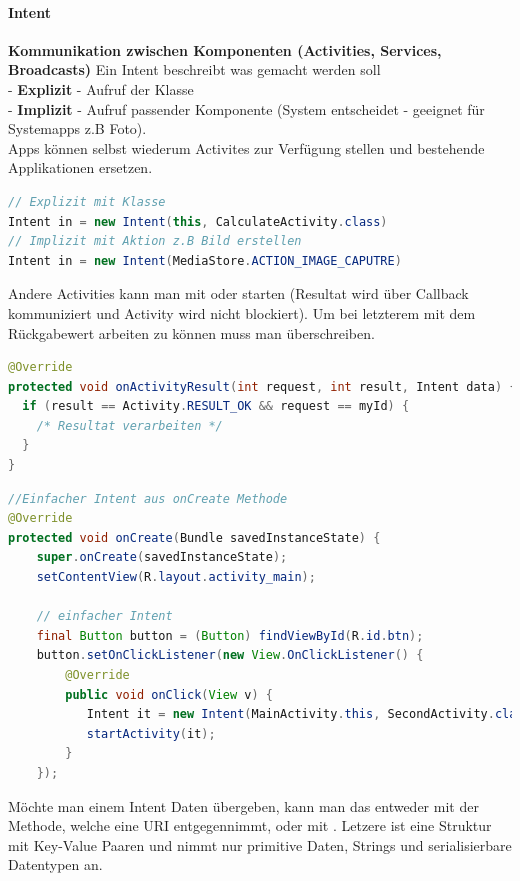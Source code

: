 \paragraph{Intent}
\textbf{Kommunikation zwischen Komponenten (Activities, Services, Broadcasts)}
Ein Intent beschreibt was gemacht werden soll \\
- \textbf{Explizit} - Aufruf der Klasse \\
-  \textbf{Implizit} - Aufruf passender Komponente (System entscheidet - geeignet für Systemapps z.B Foto).\\
Apps können selbst wiederum Activites zur Verfügung stellen und bestehende Applikationen ersetzen.
\begin{lstlisting}[language=java]
// Explizit mit Klasse
Intent in = new Intent(this, CalculateActivity.class)
// Implizit mit Aktion z.B Bild erstellen 
Intent in = new Intent(MediaStore.ACTION_IMAGE_CAPUTRE)
\end{lstlisting}
Andere Activities kann man mit  oder  starten (Resultat wird über Callback kommuniziert und Activity wird nicht blockiert). Um bei letzterem mit dem Rückgabewert arbeiten zu können muss man  überschreiben.
\begin{lstlisting}[language=java]
@Override
protected void onActivityResult(int request, int result, Intent data) {
  if (result == Activity.RESULT_OK && request == myId) {
    /* Resultat verarbeiten */
  }
}
\end{lstlisting}
\begin{lstlisting}[language=java]
//Einfacher Intent aus onCreate Methode
@Override
protected void onCreate(Bundle savedInstanceState) {
    super.onCreate(savedInstanceState);
    setContentView(R.layout.activity_main);

    // einfacher Intent
    final Button button = (Button) findViewById(R.id.btn);
    button.setOnClickListener(new View.OnClickListener() {
        @Override
        public void onClick(View v) {
           Intent it = new Intent(MainActivity.this, SecondActivity.class);
           startActivity(it);
        }
    });
\end{lstlisting}
Möchte man einem Intent Daten übergeben, kann man das entweder mit der  Methode, welche eine URI entgegennimmt, oder mit . Letzere ist eine Struktur mit Key-Value Paaren und nimmt nur primitive Daten, Strings und serialisierbare Datentypen an.
